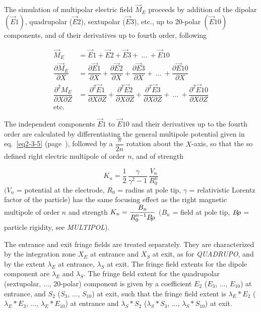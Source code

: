 The simulation of multipolar electric  field $ \vec  M_E $ proceeds by addition of 
the dipolar $ (\vec  E1) $,  quadrupolar ($ \vec  E2 $), sextupolar ($ \vec  E3 $), 
etc.,  up to 20-polar $ (\vec  E10) $ components, and of their derivatives up to fourth 
order, following

\begin{align*}
	\vec  M_E & = \vec  E1 + \vec  E2 + \vec  E3 + ~...~ + \vec  E10 \\
	\dfrac{ \partial\vec  M_E }{ \partial X}  
	          & =  \dfrac{ \partial\vec  E1 }{ \partial X} +
	               \dfrac{\partial\vec  E2 }{ \partial X} + 
	               \dfrac{\partial\vec  E3 }{ \partial X} +
	                         ~...~ +
	               \dfrac{\partial\vec  E10 }{ \partial X}  \\
	\dfrac{ \partial^ 2M_E}{ \partial X\partial Z} 
	          &   = \dfrac{\partial^ 2\vec  E1 }{ \partial X\partial Z} +
	               \dfrac{\partial^ 2\vec  E2 }{\partial X\partial Z} + 
	               \dfrac{\partial^ 2\vec  E3 }{ \partial X\partial Z} +
                                 ~...~ +
	               \dfrac{\partial^ 2\vec  E10 }{ \partial X\partial Z}  \\
	   \text{etc.} &
\end{align*}

\noindent The independent components $ \vec  E1 $ to $ \vec  E10 $ and their
derivatives up to the fourth  order are calculated by differentiating the general multipole potential 
 given  in eq.~\ref{eq2-3-5} (page~\pageref{eq2-3-5}), followed by 
  a $ \dfrac{\pi }{ 2n} $ rotation about the $ X$-axis, so
that the so defined right electric multipole of order $ n$,  and of 
strength~\cite{Biblio14, Biblio15}   %

$$ K_n = \dfrac{1 }{ 2}\, \dfrac{\gamma }{ \gamma^ 2-1}\, \dfrac{V_ n }{ R^n_0} $$
%
$ (V_ n $ = potential at the electrode, $ R_0 $ = radius at pole tip, 
$\gamma$  = relativistic Lorentz factor of the particle) has the same focusing effect 
 as  the right magnetic multipole of order $ n $ and strength
 $ K_n= \dfrac{B_n }{ R^{n-1}_0 B\!\rho} $ 
$ (B_n $ = field at pole tip, $ B\!\rho $ = particle rigidity, see \textsl{MULTIPOL}). 


\medskip

\noindent The entrance and exit fringe fields are treated separately.  They
are characterized by the integration zone $ X_E $ at entrance and $ X_S $ at exit,
as for \textsl{QUADRUPO}, and by the extent $ \lambda_ E $ at entrance, $\lambda_ S $ 
at exit. The fringe field extents for the dipole component are $ \lambda_ E $
and $ \lambda_ S $. The fringe field extent for the quadrupolar (sextupolar,  ..., 
 20-polar) component is given by a coefficient $ E_2 $ 
 ($E_3$, ..., $E_{10}$)   at entrance, and $ S_2 $ ($ S_3$, ..., $S_{10}$)   at exit, 
 such that the fringe field extent is $ \lambda_ E\ast E_2$  
 ($\lambda_ E\ast E_3$, ..., $\lambda_ E\ast E_{10}$)  at 
entrance and $ \lambda_ S\ast S_2 $  ($\lambda_ S\ast S_3$, ..., $\lambda_ S\ast S_{10}$) 
 at exit.  
\medskip

